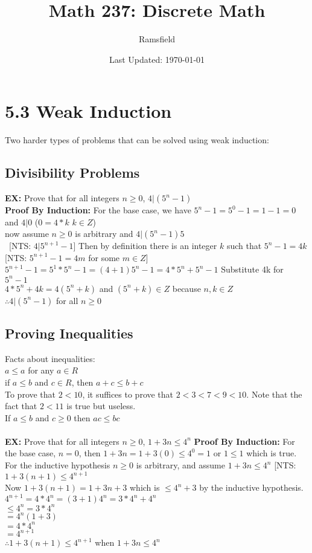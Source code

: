 \documentclass{article}
\begin{document}
	\title{Math 237: Discrete Math}
	\author{Ramsfield}
	\date{Last Updated: \today}
	\maketitle
		\section[03/27/18]{5.3 Weak Induction}
		Two harder types of problems that can be solved using weak induction:
		\subsection{Divisibility Problems}
		\textbf{EX:} Prove that for all integers $n \geq 0$, $4|(5^n-1)$ \\
		\textbf{Proof By Induction:} For the base case, we have $5^n-1 =5^0 -1 = 1-1=0$ and $4|0$ ($0=4*k$ $k\in Z$)
		\\ now assume $n\geq 0$ is arbitrary and $4|(5^n-1)5$ \\\
		[NTS: $4|5^{n+1}-1$] Then by definition there is an integer $k$ such that $5^n-1=4k$ [NTS: $5^{n+1}-1=4m$ for some $m \in Z$] \\
		$5^{n+1}-1=5^1*5^n-1=(4+1)5^n-1=4*5^n+5^n-1$ Substitute 4k for $5^n-1$ \\
		$4*5^n + 4k = 4(5^n+k)$ and $(5^n+k) \in Z$ because $n,k \in Z$ \\
		$\therefore 4|(5^n-1)$ for all $n\geq 0$
		\subsection{Proving Inequalities}
		Facts about inequalities: \\
		$a\leq a$ for any $a\in R$ \\
		if $a \leq b$ and $c \in R$, then $a+c \leq b+c$ \\
		To prove that $2<10$, it suffices to prove that $2<3<7<9<10$. Note that the fact that $2<11$ is true but useless. \\
		If $a\leq b$ and $c\geq 0$ then $ac\leq bc$
		\\ \\
		\textbf{EX:} Prove that for all integers $n\geq 0$, $1+3n\leq 4^n$
		\textbf{Proof By Induction:} For the base case, $n=0$, then $1+3n = 1+3(0) \leq 4^0 = 1$ or $1\leq 1$ which is true. \\
		For the inductive hypothesis $n\geq 0$ is arbitrary, and assume $1+3n\leq 4^n$ [NTS: $1+3(n+1)\leq 4^{n+1}$ \\
		Now $1+3(n+1)=1+3n+3$ which is $\leq 4^n+3$ by the inductive hypothesis. \\
		$4^{n+1} = 4*4^n = (3+1)4^n = 3*4^n+4^n$ \\
		$\leq 4^n=3*4^n$\\
		$= 4^n(1+3)$\\
		$=4*4^n$\\
		$=4^{n+1}$\\
		$\therefore 1+3(n+1)\leq 4^{n+1}$ when $1+3n\leq 4^n$\\
\end{document}
